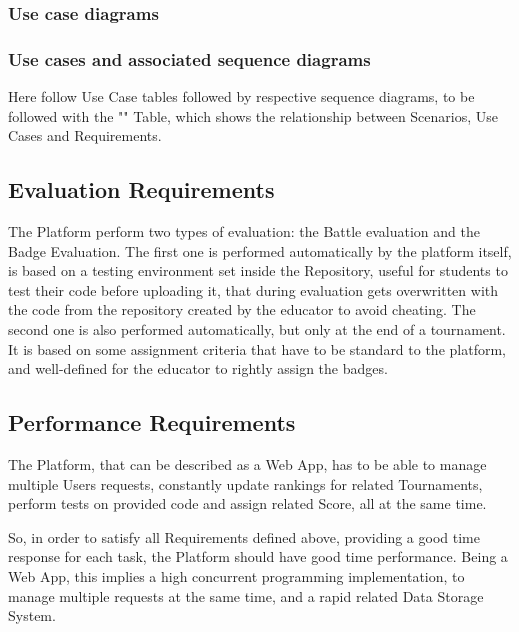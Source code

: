 \newpage

\subsubsection{Use case diagrams}

\newpage

\subsubsection{Use cases and associated sequence diagrams}
Here follow Use Case tables followed by respective sequence diagrams, to be followed with the "" Table, which shows the relationship between Scenarios, Use Cases and Requirements.

\subsection{Evaluation Requirements}
The Platform perform two types of evaluation: the Battle evaluation and the Badge Evaluation. 
The first one is performed automatically by the platform itself, is based on a testing environment set inside the Repository, useful for students to test their code before uploading it, that during evaluation gets overwritten with the code from the repository created by the educator to avoid cheating.
The second one is also performed automatically, but only at the end of a tournament. It is based on some assignment criteria that have to be standard to the platform, and well-defined for the educator to rightly assign the badges.

\subsection{Performance Requirements}
The Platform, that can be described as a Web App, has to be able to manage multiple Users requests, constantly update rankings for related Tournaments, perform tests on provided code and assign related Score, all at the same time. 

So, in order to satisfy all Requirements defined above, providing a good time response for each task, the Platform should have good time performance. Being a Web App, this implies a high concurrent programming implementation, to 
manage multiple requests at the same time, and a rapid related Data Storage System. 

